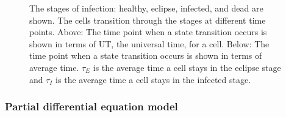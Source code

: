 \begin{figure}
\begin{tikzpicture}
    \end{tikzpicture}
\caption{The stages of infection: healthy, eclipse, infected, and dead are shown. The cells transition through the stages at different time points. Above: The time point when a state transition occurs is shown in terms of UT, the universal time, for a cell. %
Below: The time point when a state transition occurs is shown in terms of average time. $\tau_E$ is the average time a cell stays in  the eclipse stage and $\tau_I$ is the average time a cell stays in the infected stage. \label{fig:transitioning_through_the_stages_of_infection}}
\end{figure}

\subsubsection{Partial differential equation model} \label{PDEM}

